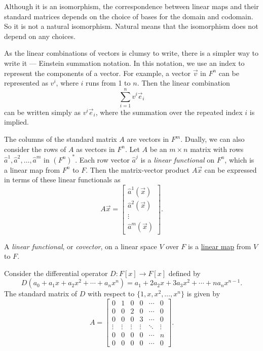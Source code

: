 \begin{remark}
  Although it is an isomorphism, the correspondence between linear maps and their standard matrices depends on the choice of bases for the domain and codomain. So it is not a natural isomorphism. Natural means that the isomorphism does not depend on any choices.
\end{remark}

As the linear combinations of vectors is clumsy to write, there is a simpler way to write it --- Einstein summation notation. In this notation, we use an index to represent the components of a vector. For example, a vector $\vec{v}$ in $F^n$ can be represented as $v^i$, where $i$ runs from 1 to $n$. Then the linear combination
\[ \sum_{i=1}^n v^i \vec{e}_i \]
can be written simply as $v^i \vec{e}_i$, where the summation over the repeated index $i$ is implied.

The columns of the standard matrix $A$ are vectors in $F^m$. Dually, we can also consider the rows of $A$ as vectors in $F^n$. Let $A$ be an $m \times n$ matrix with rows $\hat{a}^1, \hat{a}^2, \ldots, \hat{a}^m$ in ${(F^n)}^*$. Each row vector $\hat{a}^j$ is a \emph{linear functional} on $F^n$, which is a linear map from $F^n$ to $F$. Then the matrix-vector product $A \vec{x}$ can be expressed in terms of these linear functionals as
\[
  A \vec{x} = \begin{bmatrix}
    \hat{a}^1(\vec{x}) \\
    \hat{a}^2(\vec{x}) \\
    \vdots             \\
    \hat{a}^m(\vec{x})
  \end{bmatrix}.
\]

\begin{definition}\label{def:linear_functional}
  A \emph{linear functional}, or \emph{covector}, on a linear space $V$ over $F$ is a \hyperref[def:linear_map]{linear map} from $V$ to $F$.
\end{definition}

\begin{example}
  Consider the differential operator $D \colon F[x] \to F[x]$ defined by
  \[
    D\left( a_0 + a_1 x + a_2 x^2 + \cdots + a_n x^n \right) = a_1 + 2 a_2 x + 3 a_3 x^2 + \cdots + n a_n x^{n-1}.
  \]
  The standard matrix of $D$ with respect to $\{ 1, x, x^2, \ldots, x^n \}$ is given by
  \[
    A = \begin{bmatrix}
      0      & 1      & 0      & 0      & \cdots & 0      \\
      0      & 0      & 2      & 0      & \cdots & 0      \\
      0      & 0      & 0      & 3      & \cdots & 0      \\
      \vdots & \vdots & \vdots & \vdots & \ddots & \vdots \\
      0      & 0      & 0      & 0      & \cdots & n      \\
      0      & 0      & 0      & 0      & \cdots & 0
    \end{bmatrix}.
  \]
\end{example}

